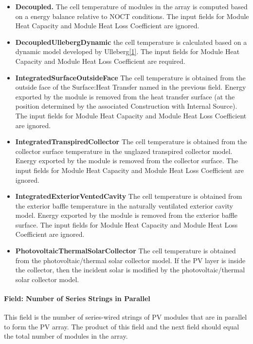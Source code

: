 \begin{itemize}
\item
  \textbf{Decoupled.} The cell temperature of modules in the array is computed based on a energy balance relative to NOCT conditions. The input fields for Module Heat Capacity and Module Heat Loss Coefficient are ignored.
\item
  \textbf{DecoupledUllebergDynamic} the cell temperature is calculated based on a dynamic model developed by Ulleberg\protect\hyperlink{ux5fftn1}{{[}1{]}}. The input fields for Module Heat Capacity and Module Heat Loss Coefficient are required.
\item
  \textbf{IntegratedSurfaceOutsideFace} The cell temperature is obtained from the outside face of the Surface:Heat Transfer named in the previous field. Energy exported by the module is removed from the heat transfer surface (at the position determined by the associated Construction with Internal Source). The input fields for Module Heat Capacity and Module Heat Loss Coefficient are ignored.
\item
  \textbf{IntegratedTranspiredCollector} The cell temperature is obtained from the collector surface temperature in the unglazed transpired collector model. Energy exported by the module is removed from the collector surface. The input fields for Module Heat Capacity and Module Heat Loss Coefficient are ignored.
\item
  \textbf{IntegratedExteriorVentedCavity} The cell temperature is obtained from the exterior baffle temperature in the naturally ventilated exterior cavity model. Energy exported by the module is removed from the exterior baffle surface. The input fields for Module Heat Capacity and Module Heat Loss Coefficient are ignored.
\item
  \textbf{PhotovoltaicThermalSolarCollector} The cell temperature is obtained from the photovoltaic/thermal solar collector model. If the PV layer is inside the collector, then the incident solar is modified by the photovoltaic/thermal solar collector model.
\end{itemize}

\paragraph{Field: Number of Series Strings in Parallel}\label{field-number-of-series-strings-in-parallel}

This field is the number of series-wired strings of PV modules that are in parallel to form the PV array. The product of this field and the next field should equal the total number of modules in the array.


